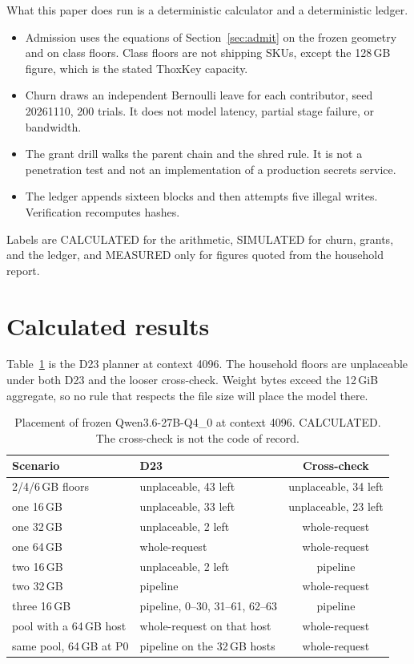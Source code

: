 \documentclass[11pt]{article}
\begin{document}
What this paper does run is a deterministic calculator and a deterministic ledger.
\begin{itemize}
\item Admission uses the equations of Section~\ref{sec:admit} on the frozen geometry and on class floors. Class floors are not shipping SKUs, except the 128\,GB figure, which is the stated ThoxKey capacity.
\item Churn draws an independent Bernoulli leave for each contributor, seed 20261110, 200 trials. It does not model latency, partial stage failure, or bandwidth.
\item The grant drill walks the parent chain and the shred rule. It is not a penetration test and not an implementation of a production secrets service.
\item The ledger appends sixteen blocks and then attempts five illegal writes. Verification recomputes hashes.
\end{itemize}
Labels are CALCULATED for the arithmetic, SIMULATED for churn, grants, and the ledger, and MEASURED only for figures quoted from the household report.

\section{Calculated results}
\label{sec:results}
Table~\ref{tab:place} is the D23 planner at context 4096. The household floors are unplaceable under both D23 and the looser cross-check. Weight bytes exceed the 12\,GiB aggregate, so no rule that respects the file size will place the model there.

\begin{table}[t]
\centering
\small
\begin{tabular}{llc}
\toprule
Scenario & D23 & Cross-check \\
\midrule
2/4/6\,GB floors & unplaceable, 43 left & unplaceable, 34 left \\
one 16\,GB & unplaceable, 33 left & unplaceable, 23 left \\
one 32\,GB & unplaceable, 2 left & whole-request \\
one 64\,GB & whole-request & whole-request \\
two 16\,GB & unplaceable, 2 left & pipeline \\
two 32\,GB & pipeline & whole-request \\
three 16\,GB & pipeline, 0--30, 31--61, 62--63 & pipeline \\
pool with a 64\,GB host & whole-request on that host & whole-request \\
same pool, 64\,GB at P0 & pipeline on the 32\,GB hosts & whole-request \\
\bottomrule
\end{tabular}
\caption{Placement of frozen Qwen3.6-27B-Q4\_0 at context 4096. CALCULATED. The cross-check is not the code of record.}
\label{tab:place}
\end{table}
\end{document}
